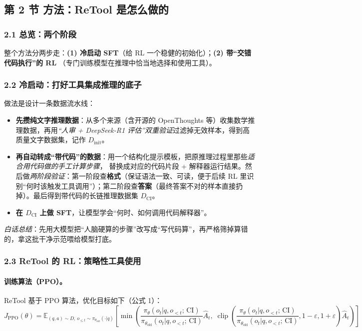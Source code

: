 \documentclass[11pt,UTF8,fontset=fandol]{ctexart}
\begin{document}
\subsection{第 2 节 方法：ReTool 是怎么做的}

\subsubsection{2.1 总览：两个阶段}
整个方法分两步走：\textbf{(1) 冷启动 SFT}（给 RL 一个稳健的初始化）；\textbf{(2) 带“交错代码执行”的 RL}
（专门训练模型在推理中恰当地选择和使用工具）。

\subsubsection{2.2 冷启动：打好工具集成推理的底子}
做法是设计一条数据流水线：
\begin{itemize}[leftmargin=1.6em,itemsep=2pt]
  \item \textbf{先攒纯文字推理数据}：从多个来源（含开源的 OpenThoughts 等）收集数学推理数据，再用\emph{“人审 + DeepSeek-R1
  评估”双重验证}过滤掉无效样本，得到高质量文字数据集，记作 $D_{\text{init}}$。
  \item \textbf{再自动转成“带代码”的数据}：用一个结构化提示模板，把原推理过程里那些\emph{适合用代码做的手工计算步骤}，
  替换成对应的代码片段 + 解释器运行结果。然后做\emph{两阶段验证}：第一阶段查\textbf{格式}（保证语法一致、可读，便于后续 RL
  里识别“何时该触发工具调用”）；第二阶段查\textbf{答案}（最终答案不对的样本直接扔掉）。最后得到带代码的长链推理数据集
  $D_{\text{CI}}$。
  \item \textbf{在 $D_{\text{CI}}$ 上做 SFT}，让模型学会“何时、如何调用代码解释器”。
\end{itemize}
\emph{白话总结}：先用大模型把“人脑硬算的步骤”改写成“写代码算”，再严格筛掉算错的，拿这批干净示范喂给模型打底。

\subsubsection{2.3 ReTool 的 RL：策略性工具使用}

\paragraph{训练算法（PPO）。} ReTool 基于 PPO 算法，优化目标如下（公式 1）：
\begin{equation*}
J_{\text{PPO}}(\theta)=\mathbb{E}_{(q,a)\sim D,\,o_{\le t}\sim\pi_{\theta_{\text{old}}}(\cdot|q)}
\left[\min\!\left(\frac{\pi_\theta(o_t|q,o_{<t};\,\text{CI})}{\pi_{\theta_{\text{old}}}(o_t|q,o_{<t};\,\text{CI})}\hat{A}_t,\;
\operatorname{clip}\!\left(\frac{\pi_\theta(o_t|q,o_{<t};\,\text{CI})}{\pi_{\theta_{\text{old}}}(o_t|q,o_{<t};\,\text{CI})},1-\varepsilon,1+\varepsilon\right)\hat{A}_t\right)\right]
\end{equation*}
\end{document}
